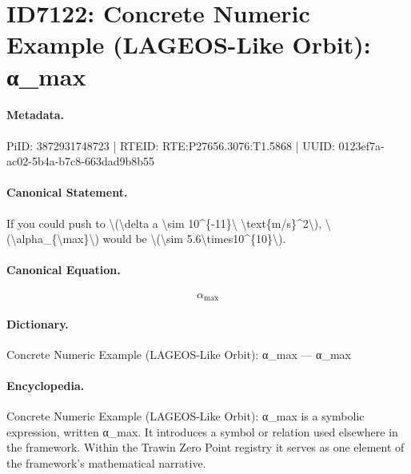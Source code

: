 \section*{ID7122: Concrete Numeric Example (LAGEOS-Like Orbit): α\_max}
\paragraph{Metadata.}
PiID: 3872931748723 | RTEID: RTE:P27656.3076:T1.5868 | UUID: 0123ef7a-ac02-5b4a-b7c8-663dad9b8b55

\paragraph{Canonical Statement.}
If you could push to \textbackslash{}(\textbackslash{}delta a \textbackslash{}sim 10\textasciicircum{}\{-11\}\textbackslash{} \textbackslash{}text\{m/s\}\textasciicircum{}2\textbackslash{}), \textbackslash{}(\textbackslash{}alpha\_\{\textbackslash{}max\}\textbackslash{}) would be \textbackslash{}(\textbackslash{}sim 5.6\textbackslash{}times10\textasciicircum{}\{10\}\textbackslash{}).

\paragraph{Canonical Equation.}
\[
\alpha_{\max}
\]

\paragraph{Dictionary.}
Concrete Numeric Example (LAGEOS-Like Orbit): α\_max — α\_max

\paragraph{Encyclopedia.}
Concrete Numeric Example (LAGEOS-Like Orbit): α\_max is a symbolic expression, written α\_max. It introduces a symbol or relation used elsewhere in the framework. Within the Trawin Zero Point registry it serves as one element of the framework's mathematical narrative.
